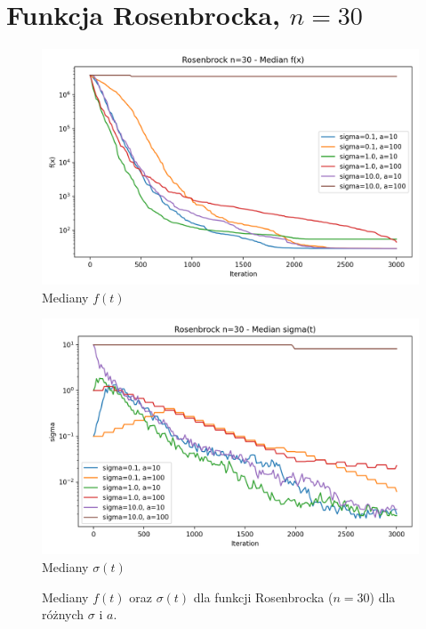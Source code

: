 \documentclass[a4paper,12pt]{article}
\begin{document}
\section{Funkcja Rosenbrocka, $n=30$}
\begin{figure}[H]
    \centering
    \begin{minipage}{0.48\textwidth}
        \centering
        \includegraphics[width=\textwidth]{charts/Rosenbrock_n30_all_medians.png}\\
        \small Mediany $f(t)$
    \end{minipage}\hfill
    \begin{minipage}{0.48\textwidth}
        \centering
        \includegraphics[width=\textwidth]{charts/Rosenbrock_n30_all_sigmas.png}\\
        \small Mediany $\sigma(t)$
    \end{minipage}
    \caption{Mediany $f(t)$ oraz $\sigma(t)$ dla funkcji Rosenbrocka ($n=30$) dla różnych $\sigma$ i $a$.}
\end{figure}
\end{document}
